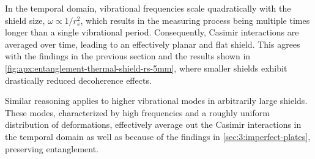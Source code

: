 In the temporal domain, vibrational frequencies scale quadratically with the shield size, $\omega \propto 1/r_s^2$, which results in the measuring process being multiple times longer than a single vibrational period. 
Consequently, Casimir interactions are averaged over time, leading to an effectively planar and flat shield.
This agrees with the findings in the previous section and the results shown in \cref{fig:apx:entanglement-thermal-shield-rs-5mm}, where smaller shields exhibit drastically reduced decoherence effects.

Similar reasoning applies to higher vibrational modes in arbitrarily large shields. 
These modes, characterized by high frequencies and a roughly uniform  distribution of deformations, effectively average out the Casimir interactions in the temporal domain as well as because of the findings in \cref{sec:3:imperfect-plates}, preserving entanglement.
